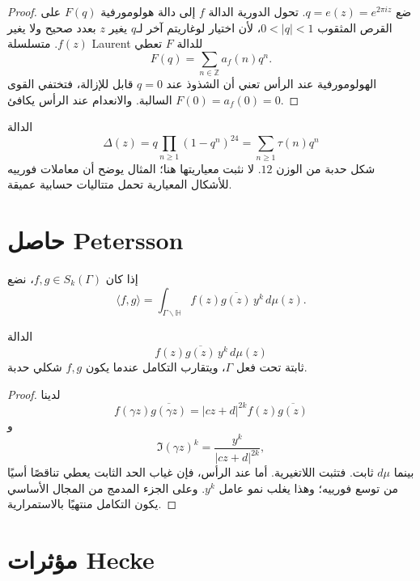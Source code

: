 \begin{proof}
ضع \(q=e(z)=e^{2\pi iz}\). تحول الدورية الدالة \(f\) إلى دالة
هولومورفية \(F(q)\) على القرص المثقوب \(0<|q|<1\)، لأن اختيار
لوغاريتم آخر لـ\(q\) يغير \(z\) بعدد صحيح ولا يغير \(f(z)\).
متسلسلة Laurent للدالة \(F\) تعطي
\[
F(q)=\sum_{n\in\mathbb Z}a_f(n)q^n.
\]
الهولومورفية عند الرأس تعني أن الشذوذ عند \(q=0\) قابل للإزالة، فتختفي
القوى السالبة. والانعدام عند الرأس يكافئ \(F(0)=a_f(0)=0\).
\end{proof}

\begin{example}
الدالة
\[
\Delta(z)=q\prod_{n\ge1}(1-q^n)^{24}
=\sum_{n\ge1}\tau(n)q^n
\]
شكل حدبة من الوزن \(12\). لا نثبت معياريتها هنا؛ المثال يوضح أن معاملات
فورييه للأشكال المعيارية تحمل متتاليات حسابية عميقة.
\end{example}

\section{حاصل Petersson}

\begin{definition}
\label{def:petersson-inner-product}
إذا كان \(f,g\in S_k(\Gamma)\)، نضع
\[
\langle f,g\rangle
=
\int_{\Gamma\backslash\mathbb H}
f(z)\overline{g(z)}\,y^k\,d\mu(z).
\]
\end{definition}

\begin{proposition}
\label{prop:petersson-invariance}
\provedhere
الدالة
\[
f(z)\overline{g(z)}\,y^k\,d\mu(z)
\]
ثابتة تحت فعل \(\Gamma\)، ويتقارب التكامل عندما يكون \(f,g\) شكلي
حدبة.
\end{proposition}

\begin{proof}
لدينا
\[
f(\gamma z)\overline{g(\gamma z)}
=|cz+d|^{2k}f(z)\overline{g(z)}
\]
و
\[
\Im(\gamma z)^k=\frac{y^k}{|cz+d|^{2k}},
\]
بينما \(d\mu\) ثابت. فتثبت اللاتغيرية. أما عند الرأس، فإن غياب الحد
الثابت يعطي تناقصًا أسيًا من توسع فورييه؛ وهذا يغلب نمو عامل \(y^k\).
وعلى الجزء المدمج من المجال الأساسي يكون التكامل منتهيًا بالاستمرارية.
\end{proof}

\section{مؤثرات Hecke}


